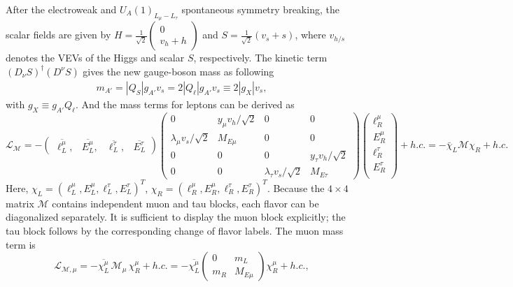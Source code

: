 \documentclass[onecolumn, aps, nofootinbib, prd, preprint, floats, floatfix, amsmath, amssymb, superscriptaddress, preprintnumbers]{revtex4-2}
\begin{document}
After the electroweak and $U_A(1)_{L_\mu-L_\tau}$ spontaneous symmetry breaking, the scalar fields are given by $H=\frac{1}{\sqrt{2}}\left (\begin{array}{c} 0 \\ v_h+h \end{array}\right)$ and $S=\frac{1}{\sqrt{2}} (v_s + s)$, where $v_{h/s}$ denotes the VEVs of the Higgs and scalar $S$, respectively. The kinetic term
$(D_\nu S)^\dagger(D^\nu S)$ gives the new gauge-boson mass as following
\begin{align}
m_{A'}=|Q_S|g_{A'}v_s=2|Q_\ell|g_{A'}v_s\equiv2|g_X|v_s,
\end{align} 
with $g_X\equiv g_{A'}Q_\ell$. And the mass terms for leptons can be derived as
\begin{equation}
\mathcal{L}_{\mathcal M}=-
\begin{pmatrix}
	\overline{\ell^{\mu}_L},  &
	\overline{E^\mu_L}, &
	\overline{\ell^\tau_L}, &
	\overline{E^\tau_L}
\end{pmatrix}
\begin{pmatrix}
	0 & y_{\mu}v_h/\sqrt2  & 0 & 0 \\
	\lambda_\mu v_s/\sqrt2 & M_{E\mu} & 0 & 0\\
	0 & 0 & 0 & y_{\tau}v_h/\sqrt2\\
    0 & 0 &  \lambda_\tau v_s/\sqrt2 & M_{E\tau}
\end{pmatrix}
\begin{pmatrix}
	\ell^{\mu}_R \\
	E^\mu_R \\
	  \ell^\tau_R \\
	  E^\tau_R \\
\end{pmatrix}
+h.c. = -\bar{\chi}_L \mathcal{M} \chi_R + h.c.
\label{eq:4by4-mass-no-mutau}
\end{equation}
Here, $\chi_L=(\ell^{\mu}_L,E^\mu_L,\ell^\tau_L, E^\tau_L)^T$, $\chi_R=(\ell^{\mu}_R,E^\mu_R,\ell^\tau_R, E^\tau_R)^T$. Because the
$4\times4$ matrix $\mathcal M$ contains independent muon and tau blocks, each
flavor can be diagonalized separately.  It is sufficient to display the muon
block explicitly; the tau block follows by the corresponding change of flavor
labels.  The muon mass term is
\begin{equation}
\mathcal{L}_{\mathcal{M},\mu}
=-\overline{\chi^\mu_L}\,\mathcal{M}_\mu\,\chi^\mu_R+h.c.
=-\overline{\chi^\mu_L}
\begin{pmatrix}
0 & m_L\\
m_R & M_{E\mu}
\end{pmatrix} \chi^\mu_R+h.c.,
\label{eq:mu-2by2-mass}
\end{equation}
\end{document}
